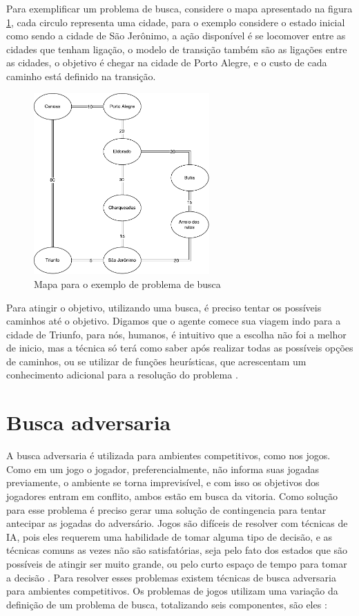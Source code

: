 Para exemplificar um problema de busca, considere o mapa apresentado na figura \ref{fig:mapabusca}, cada circulo representa uma cidade, para o exemplo considere o estado inicial como sendo a cidade de São Jerônimo, a ação disponível é se locomover entre as cidades que tenham ligação, o modelo de transição também são as ligações entre as cidades, o objetivo é chegar na cidade de Porto Alegre, e o custo de cada caminho está definido na transição. 

\begin{figure}[ht]
	\centering
	\includegraphics[width=0.6\textwidth]{fig/mapabusca.pdf}
	\caption{Mapa para o exemplo de problema de busca}
	\label{fig:mapabusca}
\end{figure} 

Para atingir o objetivo, utilizando uma busca, é preciso tentar os possíveis caminhos até o objetivo. Digamos que o agente comece sua viagem indo para a cidade de Triunfo, para nós, humanos, é intuitivo que a escolha não foi a melhor de inicio, mas a técnica só terá como saber após realizar todas as possíveis opções de caminhos, ou se utilizar de funções heurísticas, que acrescentam um conhecimento adicional para a resolução do problema \cite{intelligence2003modern}.

\section{Busca adversaria}

A busca adversaria é utilizada para ambientes competitivos, como nos jogos. Como em um jogo o jogador, preferencialmente, não informa suas jogadas previamente, o ambiente se torna imprevisível, e com isso os objetivos dos jogadores entram em conflito, ambos estão em busca da vitoria. Como solução para esse problema é preciso gerar uma solução de contingencia para tentar antecipar as jogadas do adversário. 	Jogos são difíceis de resolver com técnicas de IA, pois eles requerem uma habilidade de tomar alguma tipo de decisão, e as técnicas comuns as vezes não são satisfatórias, seja pelo fato dos estados que são possíveis de atingir ser muito grande, ou pelo curto espaço de tempo para tomar a decisão \cite{intelligence2003modern}. Para resolver esses problemas existem técnicas de busca adversaria para ambientes competitivos. Os problemas de jogos utilizam uma variação da definição de um problema de busca, totalizando seis componentes, são eles \cite{intelligence2003modern}:

